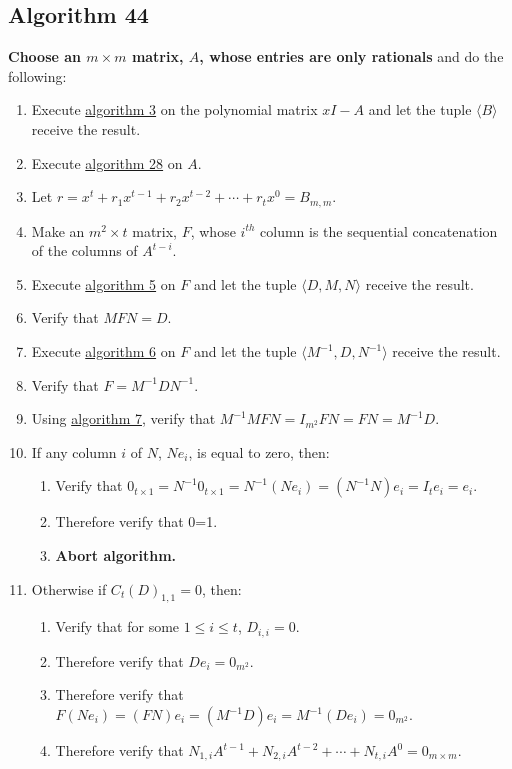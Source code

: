 \documentclass[twocolumn]{article}
\begin{document}
		\subsection{Algorithm 44}\label{sec:algorithm 44}
			\textbf{Choose an $m\times m$ matrix, $A$, whose entries are only rationals} and do the following:
			\begin{enumerate}
				\item Execute \hyperref[sec:algorithm 3]{algorithm 3} on the polynomial matrix $xI-A$ and let the tuple $\langle B\rangle$ receive the result.
				\item Execute \hyperref[sec:algorithm 28]{algorithm 28} on $A$.
				\item Let $r=x^t+r_1x^{t-1}+r_2x^{t-2}+\cdots+r_tx^0=B_{m,m}$.
				\item Make an $m^2\times t$ matrix, $F$, whose $i^{th}$ column is the sequential concatenation of the columns of $A^{t-i}$.
				\item Execute \hyperref[sec:algorithm 5]{algorithm 5} on $F$ and let the tuple $\langle D,M,N\rangle$ receive the result.
				\item Verify that $MFN=D$.
				\item Execute \hyperref[sec:algorithm 6]{algorithm 6} on $F$ and let the tuple $\langle M^{-1},D,N^{-1}\rangle$ receive the result.
				\item Verify that $F=M^{-1}DN^{-1}$.
				\item Using \hyperref[sec:algorithm 7]{algorithm 7}, verify that $M^{-1}MFN=I_{m^2}FN=FN=M^{-1}D$.
				\item If any column $i$ of $N$, $Ne_i$, is equal to zero, then:
				\begin{enumerate}
					\item Verify that $0_{t\times 1}=N^{-1}0_{t\times 1}=N^{-1}(Ne_i)=(N^{-1}N)e_i=I_te_i=e_i$.
					\item Therefore verify that 0=1.
					\item \textbf{Abort algorithm.}
				\end{enumerate}
				\item Otherwise if ${C_t(D)}_{1,1}=0$, then:
				\begin{enumerate}
					\item Verify that for some $1\le i\le t$, $D_{i,i}=0$.
					\item Therefore verify that $De_i=0_{m^2}$.
					\item Therefore verify that $F(Ne_i)=(FN)e_i=(M^{-1}D)e_i=M^{-1}(De_i)=0_{m^2}$.
					\item Therefore verify that $N_{1,i}A^{t-1}+N_{2,i}A^{t-2}+\cdots+N_{t,i}A^0=0_{m\times m}$.

\end{enumerate}
\end{enumerate}
\end{document}
